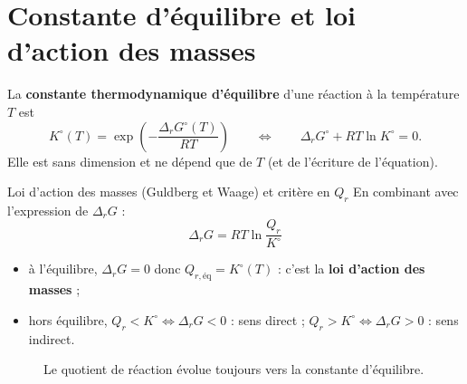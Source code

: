 \section{Constante d'équilibre et loi d'action des masses}

\begin{definition}
La \textbf{constante thermodynamique d'équilibre} d'une réaction à la température $T$ est
\[ \boxed{K^\circ(T) = \exp\left(-\frac{\Delta_rG^\circ(T)}{RT}\right)} \qquad\Longleftrightarrow\qquad \Delta_rG^\circ + RT\ln K^\circ = 0. \]
Elle est sans dimension et ne dépend que de $T$ (et de l'écriture de l'équation).
\end{definition}

\begin{resultat}{Loi d'action des masses (Guldberg et Waage) et critère en $Q_r$}
En combinant avec l'expression de $\Delta_rG$ :
\[ \boxed{\Delta_rG = RT\ln\frac{Q_r}{K^\circ}} \]
\begin{itemize}
  \item à l'équilibre, $\Delta_rG = 0$ donc $Q_{r,\text{éq}} = K^\circ(T)$ : c'est la \textbf{loi d'action des masses} ;
  \item hors équilibre, $Q_r < K^\circ \Leftrightarrow \Delta_rG < 0$ : sens direct ; $Q_r > K^\circ \Leftrightarrow \Delta_rG > 0$ : sens indirect.
\end{itemize}
\end{resultat}

\begin{figure}[H]
\centering
{}
\caption{Le quotient de réaction évolue toujours vers la constante d'équilibre.}
\label{fig:axeQK}
\end{figure}


